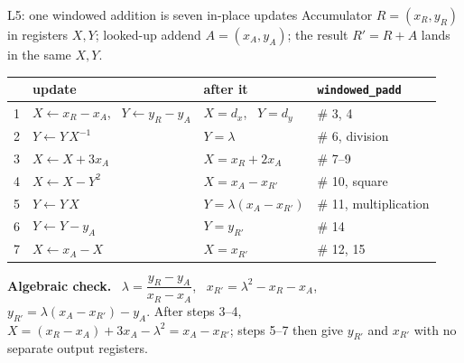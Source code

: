 \documentclass[aspectratio=169,11pt]{beamer}
\begin{document}
\setcounter{framenumber}{96}
\begin{frame}{L5: one windowed addition is seven in-place updates}
  {\small Accumulator $R=(x_R,y_R)$ in registers $X,Y$; looked-up addend $A=(x_A,y_A)$; the result $R'=R+A$ lands in the same $X,Y$.}
  \vskip1mm
  \centering\small
  \renewcommand{\arraystretch}{1.12}
  \begin{tabular}{@{}rlll@{}}
    \toprule
    & update & after it & \texttt{windowed\_padd} \\
    \midrule
    1 & $X\leftarrow x_R-x_A$, \ $Y\leftarrow y_R-y_A$ & $X=d_x$, \ $Y=d_y$ & \# 3, 4 \\
    2 & $Y\leftarrow Y\,X^{-1}$ & $Y=\lambda$ & \# 6, division \\
    3 & $X\leftarrow X+3x_A$ & $X=x_R+2x_A$ & \# 7--9 \\
    4 & $X\leftarrow X-Y^2$ & $X=x_A-x_{R'}$ & \# 10, square \\
    5 & $Y\leftarrow Y\,X$ & $Y=\lambda(x_A-x_{R'})$ & \# 11, multiplication \\
    6 & $Y\leftarrow Y-y_A$ & $Y=y_{R'}$ & \# 14 \\
    7 & $X\leftarrow x_A-X$ & $X=x_{R'}$ & \# 12, 15 \\
    \bottomrule
  \end{tabular}\par
  \vskip2mm
  \raggedright
  \begin{greyblock}[fontupper=\small]
    \textbf{Algebraic check.} \ $\lambda=\dfrac{y_R-y_A}{x_R-x_A}$, \ $x_{R'}=\lambda^2-x_R-x_A$, \ $y_{R'}=\lambda(x_A-x_{R'})-y_A$. After steps 3--4, $X=(x_R-x_A)+3x_A-\lambda^2=x_A-x_{R'}$; steps 5--7 then give $y_{R'}$ and $x_{R'}$ with no separate output registers.
  \end{greyblock}
\end{frame}
\end{document}
